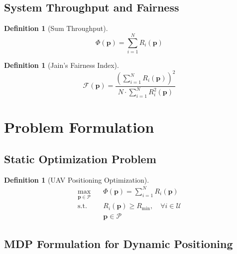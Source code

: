 \documentclass[11pt,a4paper]{article}
\newtheorem{definition}[theorem]{Definition}
\newcommand{\calP}{\mathcal{P}}
\newcommand{\calU}{\mathcal{U}}
\newcommand{\bp}{\mathbf{p}}
\begin{document}
\subsection{System Throughput and Fairness}

\begin{definition}[Sum Throughput]
\begin{equation}
    \Phi(\bp) = \sum_{i=1}^{N} R_i(\bp)
\end{equation}
\end{definition}

\begin{definition}[Jain's Fairness Index]
\begin{equation}
    \mathcal{F}(\bp) = \frac{\left(\sum_{i=1}^{N} R_i(\bp)\right)^2}{N \cdot \sum_{i=1}^{N} R_i^2(\bp)}
\end{equation}
\end{definition}

\section{Problem Formulation}

\subsection{Static Optimization Problem}

\begin{definition}[UAV Positioning Optimization]
\begin{align}
    \max_{\bp \in \calP} \quad & \Phi(\bp) = \sum_{i=1}^{N} R_i(\bp) \\
    \text{s.t.} \quad & R_i(\bp) \geq R_{\min}, \quad \forall i \in \calU \\
    & \bp \in \calP
\end{align}
\end{definition}

\subsection{MDP Formulation for Dynamic Positioning}
\end{document}
